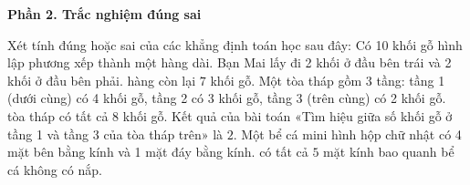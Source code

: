 \textbf{Phần 2. Trắc nghiệm đúng sai}

\begin{ex} %
Xét tính đúng hoặc sai của các khẳng định toán học sau đây:
\choiceTF
{Có 10 khối gỗ hình lập phương xếp thành một hàng dài. Bạn Mai lấy đi 2 khối ở đầu bên trái và 2 khối ở đầu bên phải. hàng còn lại $7$ khối gỗ.}
{Một tòa tháp gồm 3 tầng: tầng 1 (dưới cùng) có 4 khối gỗ, tầng 2 có 3 khối gỗ, tầng 3 (trên cùng) có 2 khối gỗ. tòa tháp có tất cả $8$ khối gỗ.}
{\True Kết quả của bài toán «Tìm hiệu giữa số khối gỗ ở tầng 1 và tầng 3 của tòa tháp trên» là $2$.}
{\True Một bể cá mini hình hộp chữ nhật có 4 mặt bên bằng kính và 1 mặt đáy bằng kính. có tất cả $5$ mặt kính bao quanh bể cá không có nắp.}
\end{ex}

